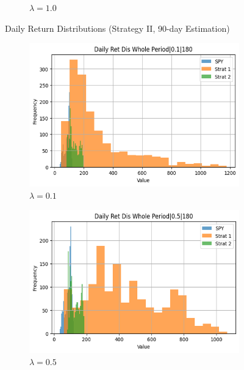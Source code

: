 \documentclass[12pt]{article}
\begin{document}
\begin{figure}[H]
\begin{subfigure}{0.32\textwidth}
\caption{$\lambda=1.0$}
\end{subfigure}
\caption{Daily Return Distributions (Strategy II, 90-day Estimation)}
\label{fig:ret_dist_90}
\end{figure}

\begin{figure}[H]
\centering
\begin{subfigure}{0.32\textwidth}
\includegraphics[width=\linewidth]{"plots/daily_ret_dis_whole_period_0.1_180.png"}
\caption{$\lambda=0.1$}
\end{subfigure}
\begin{subfigure}{0.32\textwidth}
\includegraphics[width=\linewidth]{"plots/daily_ret_dis_whole_period_0.5_180.png"}
\caption{$\lambda=0.5$}
\end{subfigure}
\begin{subfigure}{0.32\textwidth}

\end{subfigure}
\end{figure}
\end{document}
